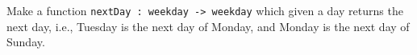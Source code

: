 Make a function \lstinline{nextDay : weekday -> weekday} which given a day returns the next day, i.e., Tuesday is the next day of Monday, and Monday is the next day of Sunday.
